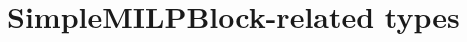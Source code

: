 \hypertarget{group___simple_m_i_l_p_block___t_y_p_e_s}{}\section{Simple\+M\+I\+L\+P\+Block-\/related types}
\label{group___simple_m_i_l_p_block___t_y_p_e_s}
